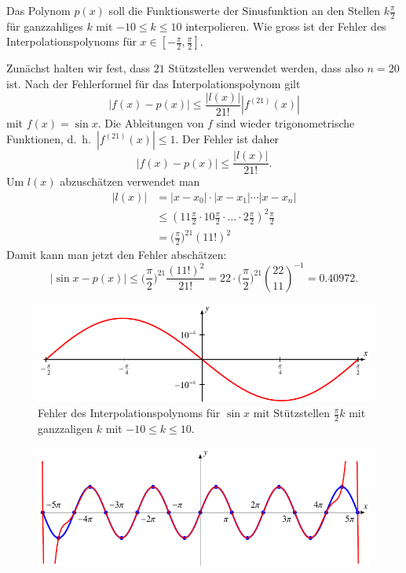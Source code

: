 Das Polynom $p(x)$ soll die Funktionswerte der Sinusfunktion an den
Stellen $k\frac{\pi}2$ für ganzzahliges $k$ mit $-10\le k\le 10$
interpolieren.
Wie gross ist der Fehler des Interpolationspolynoms für
$x\in [-\frac{\pi}2,\frac{\pi}2]$.

\begin{loesung}
Zunächst halten wir fest, dass $21$ Stützstellen verwendet werden, dass
also $n=20$ ist.
Nach der Fehlerformel für das Interpolationspolynom gilt
\[
|f(x)-p(x)| \le \frac{|l(x)|}{21!} |f^{(21)}(x)|
\]
mit $f(x)=\sin x$.
Die Ableitungen von $f$ sind wieder trigonometrische Funktionen,
d.~h.~$|f^{(21)}(x)|\le 1$.
Der Fehler ist daher
\[
|f(x)-p(x)| \le \frac{|l(x)|}{21!}.
\]
Um $l(x)$ abzuschätzen verwendet man
\begin{align*}
|l(x)|
&=
|x-x_0|\cdot|x-x_1|\cdots |x-x_n|
\\
&\le
(11\frac{\pi}2\cdot 10\frac{\pi}2\cdot\dots\cdot 2\frac{\pi}2)^2 \frac{\pi}2
\\
&=
\biggl(\frac{\pi}2\biggr)^{21}
(11!)^2
\end{align*}
Damit kann man jetzt den Fehler abschätzen:
\[
|\sin x-p(x)|
\le 
\biggl(\frac{\pi}2\biggr)^{21}
\frac{(11!)^2}{21!}
=
22\cdot 
\biggl(\frac{\pi}2\biggr)^{21}
\binom{22}{11}^{-1}
=
0.40972.
\]
\begin{figure}
\centering
\includegraphics{chapters/30-interpolation/uebungsaufgaben/3001fehler.pdf}
\caption{Fehler des Interpolationspolynoms für $\sin x$ mit Stützstellen
$\frac{\pi}2k$ mit ganzzaligen $k$ mit $-10\le k\le 10$.
\label{buch:uebungsaufgaben:figure:3001}}
\end{figure}%
\begin{figure}
\centering
\includegraphics{chapters/30-interpolation/uebungsaufgaben/3001plot.pdf}

\end{figure}
\end{loesung}
